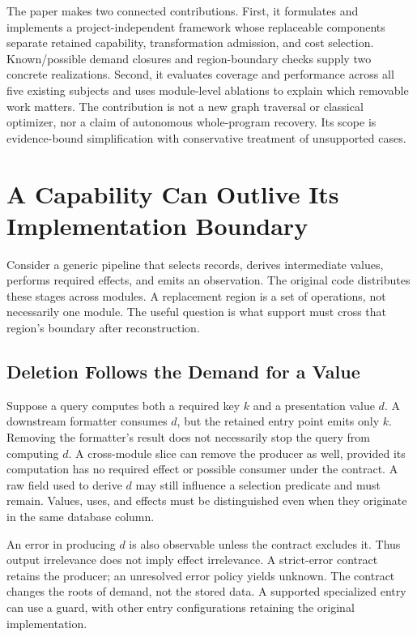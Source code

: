 \documentclass[acmsmall,screen,review,anonymous]{acmart}
\begin{document}
The paper makes two connected contributions. First, it formulates and implements
a project-independent framework whose replaceable components separate retained
capability, transformation admission, and cost selection. Known/possible demand
closures and region-boundary checks supply two concrete realizations. Second,
it evaluates coverage and performance across all five existing subjects and
uses module-level ablations to explain which removable work matters. The
contribution is not a new graph traversal or classical optimizer, nor a claim
of autonomous whole-program recovery. Its scope is evidence-bound simplification
with conservative treatment of unsupported cases.

\section{A Capability Can Outlive Its Implementation Boundary}
\label{sec:example}
Consider a generic pipeline that selects records, derives intermediate values,
performs required effects, and emits an observation. The original code distributes
these stages across modules. A replacement region is a set of operations, not
necessarily one module. The useful question is what support must cross that
region's boundary after reconstruction.

\subsection{Deletion Follows the Demand for a Value}
Suppose a query computes both a required key $k$ and a presentation value $d$.
A downstream formatter consumes $d$, but the retained entry point emits only
$k$. Removing the formatter's result does not necessarily stop the query from
computing $d$. A cross-module slice can remove the producer as well, provided
its computation has no required effect or possible consumer under the contract.
A raw field used to derive $d$ may still influence a selection predicate and
must remain. Values, uses, and effects must be distinguished even when they
originate in the same database column.

An error in producing $d$ is also observable unless the contract excludes it.
Thus output irrelevance does not imply effect irrelevance. A strict-error
contract retains the producer; an unresolved error policy yields unknown.
The contract changes the roots of demand, not the stored data. A supported
specialized entry can use a guard, with other entry configurations retaining
the original implementation.
\end{document}
